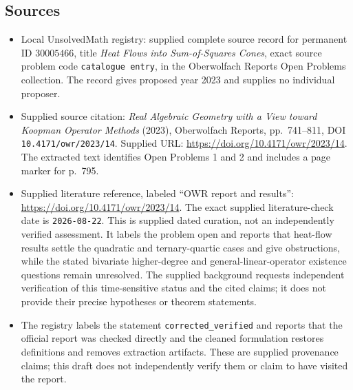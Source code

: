 \documentclass[11pt]{article}
\begin{document}
\subsection{Sources}
\begin{itemize}
\item Local UnsolvedMath registry: supplied complete source record for permanent ID \(30005466\), title \emph{Heat Flows into Sum-of-Squares Cones}, exact source problem code \texttt{catalogue entry}, in the Oberwolfach Reports Open Problems collection. The record gives proposed year 2023 and supplies no individual proposer.
\item Supplied source citation: \emph{Real Algebraic Geometry with a View toward Koopman Operator Methods} (2023), Oberwolfach Reports, pp.~741--811, DOI \texttt{10.4171/owr/2023/14}. Supplied URL: \url{https://doi.org/10.4171/owr/2023/14}. The extracted text identifies Open Problems 1 and 2 and includes a page marker for p.~795.
\item Supplied literature reference, labeled ``OWR report and results'': \url{https://doi.org/10.4171/owr/2023/14}. The exact supplied literature-check date is \texttt{2026-08-22}. This is supplied dated curation, not an independently verified assessment. It labels the problem open and reports that heat-flow results settle the quadratic and ternary-quartic cases and give obstructions, while the stated bivariate higher-degree and general-linear-operator existence questions remain unresolved. The supplied background requests independent verification of this time-sensitive status and the cited claims; it does not provide their precise hypotheses or theorem statements.
\item The registry labels the statement \texttt{corrected\_verified} and reports that the official report was checked directly and the cleaned formulation restores definitions and removes extraction artifacts. These are supplied provenance claims; this draft does not independently verify them or claim to have visited the report.
\end{itemize}
\end{document}
